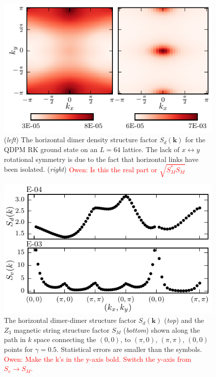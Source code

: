 \documentclass[twocolumn,prb,aps,floatfix,superscriptaddress]{revtex4-1}
\newcommand{\note}[1]{\textcolor{red}{#1}}
\begin{document}
   \begin{figure}[]
        \centering
        \includegraphics[width=1.0\columnwidth]{qdpm_dmr_vis_HM.pdf}
        \caption{({\it left}) The horizontal dimer density structure factor $S_d(\bm{k})$ for the QDPM RK ground state on an $L=64$ lattice. The lack of $x\leftrightarrow y$ rotational symmetry is due to the fact that horizontal links have been isolated. ({\it right}) \note{Owen: Is this the real part or $\sqrt{S_M^* S_M}$}}
        \label{fig:structure_factor} 
    \end{figure}
    \begin{figure}[]
        \centering
        \includegraphics[width=1.0\columnwidth]{vis_dmr_qdpm_struc_fac_32x32.pdf}
        \caption{ The horizontal dimer-dimer structure factor $S_d(\bm{k})$ ({\it top}) and the $Z_3$ magnetic string structure factor $S_M$ ({\it bottom})
        shown along the path in $k$ space connecting the $(0,0)$, to $(\pi,0)$, $(\pi,\pi)$, $(0,0)$
        points for $\gamma=0.5$. Statistical errors are smaller than the symbols. \note{Owen: Make the k's in the y-axis bold. Switch the y-axis from $S_v\rightarrow S_M$.}}
        \label{fig:structure_factor_path}
    \end{figure}
\end{document}
